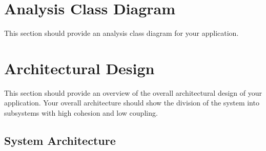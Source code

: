 \documentclass[]{article}
\begin{document}


\section{Analysis Class Diagram}
\label{sec:analysis_class_diagram}
This section should provide an analysis class diagram for your application.


\section{Architectural Design}
\label{sec:architectural_design}
This section should provide an overview of the overall architectural design of your application. Your overall architecture should show the division of the system into subsystems with high cohesion and low coupling.

\subsection{System Architecture}
\end{document}
